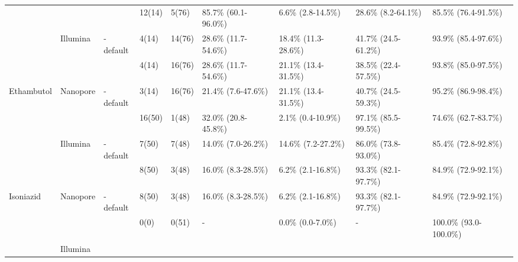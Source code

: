\begin{table}
{\begin{tabular}{|l|l|l|l|l|l|l|l|l|}
 &
   &
  \mykrobe{} &
  12(14) &
  5(76) &
  85.7\% (60.1-96.0\%) &
  6.6\% (2.8-14.5\%) &
  28.6\% (8.2-64.1\%) &
  85.5\% (76.4-91.5\%) \\ \cline{3-9} 
 &
  \multirow{-2}{*}{Illumina} &
  \cellcolor[HTML]{EFEFEF}\mykrobe{}-default &
  \cellcolor[HTML]{EFEFEF}4(14) &
  \cellcolor[HTML]{EFEFEF}14(76) &
  \cellcolor[HTML]{EFEFEF}28.6\% (11.7-54.6\%) &
  \cellcolor[HTML]{EFEFEF}18.4\% (11.3-28.6\%) &
  \cellcolor[HTML]{EFEFEF}41.7\% (24.5-61.2\%) &
  \cellcolor[HTML]{EFEFEF}93.9\% (85.4-97.6\%) \\ \cline{2-9} 
 &
   &
  \mykrobe{} &
  4(14) &
  16(76) &
  28.6\% (11.7-54.6\%) &
  21.1\% (13.4-31.5\%) &
  38.5\% (22.4-57.5\%) &
  93.8\% (85.0-97.5\%) \\ \cline{3-9} 
\multirow{-4}{*}{Ethambutol} &
  \multirow{-2}{*}{Nanopore} &
  \cellcolor[HTML]{EFEFEF}\mykrobe{}-default &
  \cellcolor[HTML]{EFEFEF}3(14) &
  \cellcolor[HTML]{EFEFEF}16(76) &
  \cellcolor[HTML]{EFEFEF}21.4\% (7.6-47.6\%) &
  \cellcolor[HTML]{EFEFEF}21.1\% (13.4-31.5\%) &
  \cellcolor[HTML]{EFEFEF}40.7\% (24.5-59.3\%) &
  \cellcolor[HTML]{EFEFEF}95.2\% (86.9-98.4\%) \\ \hline
 &
   &
  \mykrobe{} &
  16(50) &
  1(48) &
  32.0\% (20.8-45.8\%) &
  2.1\% (0.4-10.9\%) &
  97.1\% (85.5-99.5\%) &
  74.6\% (62.7-83.7\%) \\ \cline{3-9} 
 &
  \multirow{-2}{*}{Illumina} &
  \cellcolor[HTML]{EFEFEF}\mykrobe{}-default &
  \cellcolor[HTML]{EFEFEF}7(50) &
  \cellcolor[HTML]{EFEFEF}7(48) &
  \cellcolor[HTML]{EFEFEF}14.0\% (7.0-26.2\%) &
  \cellcolor[HTML]{EFEFEF}14.6\% (7.2-27.2\%) &
  \cellcolor[HTML]{EFEFEF}86.0\% (73.8-93.0\%) &
  \cellcolor[HTML]{EFEFEF}85.4\% (72.8-92.8\%) \\ \cline{2-9} 
 &
   &
  \mykrobe{} &
  8(50) &
  3(48) &
  16.0\% (8.3-28.5\%) &
  6.2\% (2.1-16.8\%) &
  93.3\% (82.1-97.7\%) &
  84.9\% (72.9-92.1\%) \\ \cline{3-9} 
\multirow{-4}{*}{Isoniazid} &
  \multirow{-2}{*}{Nanopore} &
  \cellcolor[HTML]{EFEFEF}\mykrobe{}-default &
  \cellcolor[HTML]{EFEFEF}8(50) &
  \cellcolor[HTML]{EFEFEF}3(48) &
  \cellcolor[HTML]{EFEFEF}16.0\% (8.3-28.5\%) &
  \cellcolor[HTML]{EFEFEF}6.2\% (2.1-16.8\%) &
  \cellcolor[HTML]{EFEFEF}93.3\% (82.1-97.7\%) &
  \cellcolor[HTML]{EFEFEF}84.9\% (72.9-92.1\%) \\ \hline
 &
   &
  \mykrobe{} &
  0(0) &
  0(51) &
  - &
  0.0\% (0.0-7.0\%) &
  - &
  100.0\% (93.0-100.0\%) \\ \cline{3-9} 
 &
  \multirow{-2}{*}{Illumina} &

\end{tabular}}
\end{table}
